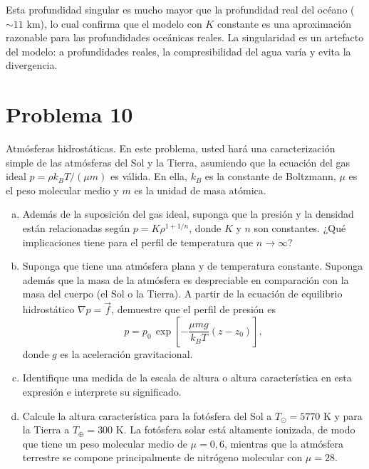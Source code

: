 \documentclass[a4paper]{article}
\begin{document}
Esta profundidad singular es mucho mayor que la profundidad real del océano ($\sim 11$ km), lo cual confirma que el modelo con $K$ constante es una aproximación razonable para las profundidades oceánicas reales. La singularidad es un artefacto del modelo: a profundidades reales, la compresibilidad del agua varía y evita la divergencia.

\section{Problema 10}
Atmósferas hidrostáticas. En este problema, usted hará una caracterización simple de las atmósferas del Sol y la Tierra, asumiendo que la ecuación del gas ideal $p = \rho k_B T/(\mu m)$ es válida. En ella, $k_B$ es la constante de Boltzmann, $\mu$ es el peso molecular medio y $m$ es la unidad de masa atómica.

\begin{enumerate}[a)]
    \item Además de la suposición del gas ideal, suponga que la presión y la densidad están relacionadas según $p = K\rho^{1+1/n}$, donde $K$ y $n$ son constantes. ¿Qué implicaciones tiene para el perfil de temperatura que $n \to \infty$?

    \item Suponga que tiene una atmósfera plana y de temperatura constante. Suponga además que la masa de la atmósfera es despreciable en comparación con la masa del cuerpo (el Sol o la Tierra). A partir de la ecuación de equilibrio hidrostático $\nabla p = \vec{f}$, demuestre que el perfil de presión es
    $$
    p = p_0\,\exp\!\left[-\frac{\mu m g}{k_B T}(z - z_0)\right],
    $$
    donde $g$ es la aceleración gravitacional.

    \item Identifique una medida de la escala de altura o altura característica en esta expresión e interprete su significado.

    \item Calcule la altura característica para la fotósfera del Sol a $T_\odot = 5770$ K y para la Tierra a $T_\oplus = 300$ K. La fotósfera solar está altamente ionizada, de modo que tiene un peso molecular medio de $\mu = 0{,}6$, mientras que la atmósfera terrestre se compone principalmente de nitrógeno molecular con $\mu = 28$.
\end{enumerate}


\end{document}
